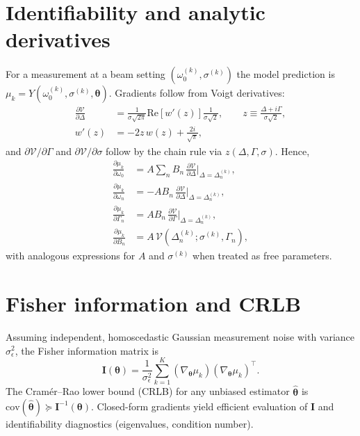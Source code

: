 \documentclass[aip,jap,preprint,amsmath,amssymb]{revtex4-2} %
\begin{document}
    \section{Identifiability and analytic derivatives}
        For a measurement at a beam setting $(\omega_0^{(k)},\sigma^{(k)})$ the model prediction is
        $\mu_k=Y\left(\omega_0^{(k)},\sigma^{(k)},\boldsymbol{\theta}\right)$. Gradients follow from Voigt derivatives:
        \begin{align}
            \frac{\partial \mathcal{V}}{\partial \Delta} &= \frac{1}{\sigma\sqrt{2\pi}}\mathrm{Re}\left[w'\left(z\right)\right]\frac{1}{\sigma\sqrt{2}},\qquad
            z\equiv \frac{\Delta+i\Gamma}{\sigma\sqrt{2}},\\
            w'(z) &= -2 z\,w(z)+\frac{2i}{\sqrt{\pi}},
        \end{align}
        and $\partial \mathcal{V}/\partial \Gamma$ and $\partial \mathcal{V}/\partial \sigma$ follow by the chain rule
        via $z(\Delta,\Gamma,\sigma)$. Hence,
        \begin{align}
            \frac{\partial \mu_k}{\partial \omega_0} &= A\sum_n B_n\,\frac{\partial \mathcal{V}}{\partial \Delta}\Big|_{\Delta=\Delta_n^{(k)}},\\
            \frac{\partial \mu_k}{\partial \omega_n} &= -A B_n\,\frac{\partial \mathcal{V}}{\partial \Delta}\Big|_{\Delta=\Delta_n^{(k)}},\\
            \frac{\partial \mu_k}{\partial \Gamma_n} &= A B_n\,\frac{\partial \mathcal{V}}{\partial \Gamma}\Big|_{\Delta=\Delta_n^{(k)}},\\
            \frac{\partial \mu_k}{\partial B_n} &= A\,\mathcal{V}\left(\Delta_n^{(k)};\sigma^{(k)},\Gamma_n\right),
        \end{align}
        with analogous expressions for $A$ and $\sigma^{(k)}$ when treated as free parameters.

    \section{Fisher information and CRLB}
        Assuming independent, homoscedastic Gaussian measurement noise with variance $\sigma_\epsilon^2$,
        the Fisher information matrix is
        \begin{equation}
            \mathbf{I}(\boldsymbol{\theta}) = \frac{1}{\sigma_\epsilon^2}\sum_{k=1}^{K}
            \left(\nabla_{\!\boldsymbol{\theta}} \mu_k\right)\left(\nabla_{\!\boldsymbol{\theta}} \mu_k\right)^{\top}.
        \end{equation}
        The Cram\'er--Rao lower bound (CRLB) for any unbiased estimator $\hat{\boldsymbol{\theta}}$ is
        $\mathrm{cov}(\hat{\boldsymbol{\theta}}) \succeq \mathbf{I}^{-1}(\boldsymbol{\theta})$. Closed-form gradients yield
        efficient evaluation of $\mathbf{I}$ and identifiability diagnostics (eigenvalues, condition number).
\end{document}
